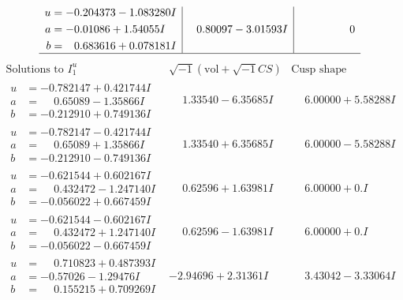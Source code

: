 \documentclass[1p]{elsarticle_modified}
\theoremstyle{definition}
\newcommand{\I}{\sqrt{-1}}
\begin{document}
$$\begin{array}{c|c|c}
\begin{aligned}
u &= -0.204373 - 1.083280 I \\
a &= -0.01086 + 1.54055 I \\
b &= \phantom{-}0.683616 + 0.078181 I\end{aligned}
 & \phantom{-}0.80097 - 3.01593 I & \phantom{-0.000000 } 0\\
 \hline 
 \end{array}$$\newpage$$\begin{array}{c|c|c}  
\text{Solutions to }I^u_{1}& \I (\text{vol} + \sqrt{-1}CS) & \text{Cusp shape}\\
 \hline 
\begin{aligned}
u &= -0.782147 + 0.421744 I \\
a &= \phantom{-}0.65089 - 1.35866 I \\
b &= -0.212910 + 0.749136 I\end{aligned}
 & \phantom{-}1.33540 - 6.35685 I & \phantom{-}6.00000 + 5.58288 I \\ \hline\begin{aligned}
u &= -0.782147 - 0.421744 I \\
a &= \phantom{-}0.65089 + 1.35866 I \\
b &= -0.212910 - 0.749136 I\end{aligned}
 & \phantom{-}1.33540 + 6.35685 I & \phantom{-}6.00000 - 5.58288 I \\ \hline\begin{aligned}
u &= -0.621544 + 0.602167 I \\
a &= \phantom{-}0.432472 - 1.247140 I \\
b &= -0.056022 + 0.667459 I\end{aligned}
 & \phantom{-}0.62596 + 1.63981 I & \phantom{-}6.00000 + 0. I\phantom{ +0.000000I} \\ \hline\begin{aligned}
u &= -0.621544 - 0.602167 I \\
a &= \phantom{-}0.432472 + 1.247140 I \\
b &= -0.056022 - 0.667459 I\end{aligned}
 & \phantom{-}0.62596 - 1.63981 I & \phantom{-}6.00000 + 0. I\phantom{ +0.000000I} \\ \hline\begin{aligned}
u &= \phantom{-}0.710823 + 0.487393 I \\
a &= -0.57026 - 1.29476 I \\
b &= \phantom{-}0.155215 + 0.709269 I\end{aligned}
 & -2.94696 + 2.31361 I & \phantom{-}3.43042 - 3.33064 I \\ \hline\begin{aligned}

\end{aligned}
\end{array}$$
\end{document}
